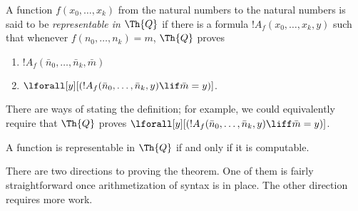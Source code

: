 \documentclass[../../include/open-logic-section]{subfiles}
\begin{document}
\begin{defn}
  A function $f(x_0,\ldots,x_k)$ from the natural numbers to
  the natural numbers is said to be {\em representable in $\Th{Q}$} if
  there is a formula $!A_f(x_0,\dots,x_k,y)$ such that whenever
  $f(n_0,\dots,n_k) = m$, $\Th{Q}$ proves
\begin{enumerate}
\item $!A_f(\bar n_0, \dots, \bar n_k,\bar m)$
\item $\lforall[y][(!A_f(\bar n_0, \dots, \bar n_k,y) \lif \bar m = y)]$.
\end{enumerate}
\end{defn}

There are ways of stating the definition; for example, we could
equivalently require that $\Th{Q}$ proves $\lforall[y][(!A_f(\bar n_0, \dots,
\bar n_k,y) \liff \bar m = y)]$.

\begin{thm}
A function is representable in $\Th{Q}$ if and only if it is computable.
\end{thm}

There are two directions to proving the theorem. One of them is fairly
straightforward once arithmetization of syntax is in place. The other
direction requires more work.
\end{document}
